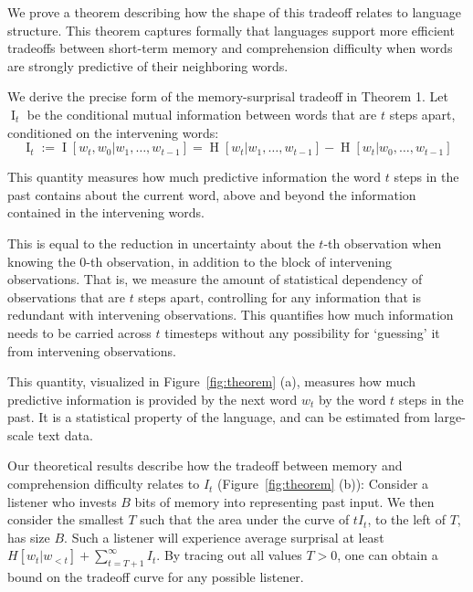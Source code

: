 We prove a theorem describing how the shape of this tradeoff relates to language structure. %
This theorem captures formally that languages support more efficient tradeoffs between short-term memory and comprehension difficulty when words are strongly predictive of their neighboring words.


We derive the precise form of the memory-surprisal tradeoff in Theorem 1.
Let $\operatorname{I}_t$ be the conditional mutual information between words that are $t$ steps apart, conditioned on the intervening words: 
\begin{equation}
	\operatorname{I}_t := \operatorname{I}[w_t, w_0 | w_1, \dots, w_{t-1}] = \operatorname{H}[w_t|w_1, \dots, w_{t-1}] - \operatorname{H}[w_t|w_0, \dots, w_{t-1}] 
\end{equation}

This quantity measures how much predictive information the word $t$ steps in the past contains about the current word, above and beyond the information contained in the intervening words.

This is equal to the reduction in uncertainty about the $t$-th observation when knowing the $0$-th observation, in addition to the block of intervening observations.
That is, we measure the amount of statistical dependency of observations that are $t$ steps apart, controlling for any information that is redundant with intervening observations.
This quantifies how much information needs to be carried across $t$ timesteps without any possibility for `guessing' it from intervening observations.

This quantity, visualized in Figure~\ref{fig:theorem} (a), measures how much predictive information is provided by the next word $w_t$ by the word $t$ steps in the past.
It is a statistical property of the language, and can be estimated from large-scale text data.


Our theoretical results describe how the tradeoff between memory and comprehension difficulty relates to $I_t$ (Figure~\ref{fig:theorem} (b)):
Consider a listener who invests $B$ bits of memory into representing past input.
We then consider the smallest $T$ such that the area under the curve of $t I_t$, to the left of $T$, has size $B$.
Such a listener will experience average surprisal at least $H[w_t| w_{<t}] + \sum_{t=T+1}^\infty I_t$. %
By tracing out all values $T >0$, one can obtain a bound on the tradeoff curve for any possible listener.

